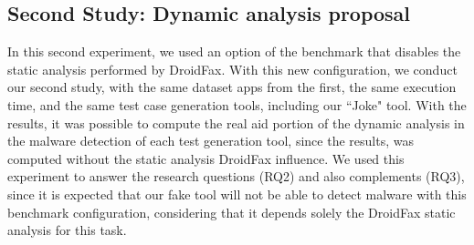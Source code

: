\subsection{Second Study: Dynamic analysis proposal}

In this second experiment, we used an option of the benchmark that disables the static analysis performed by DroidFax. With this new configuration, we conduct our second study, with the same dataset apps from the first, the same execution time, and the same test case generation tools, including our ``Joke" tool. With the results, it was possible to compute the real aid portion of the dynamic analysis in the malware detection of each test generation tool, since the results, was computed without the static analysis DroidFax influence. We used this experiment to answer the research questions (RQ2) and also complements (RQ3), since it is expected that our fake tool will not be able to detect malware with this benchmark configuration, considering that it depends solely the DroidFax static analysis for this task.







